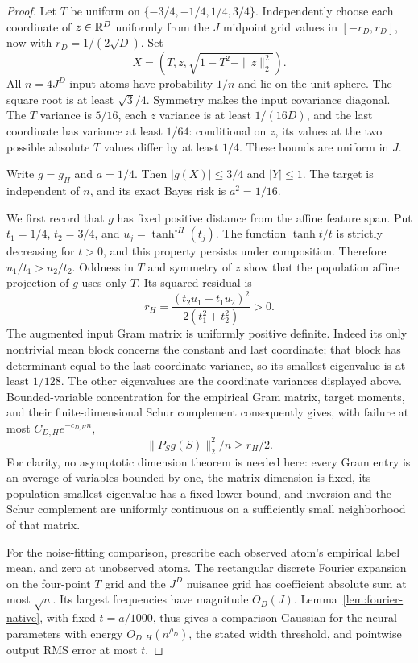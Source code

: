 \begin{proof}
Let $T$ be uniform on $\{-3/4,-1/4,1/4,3/4\}$. Independently choose each coordinate of $z\in\mathbb R^D$ uniformly from the $J$ midpoint grid values in $[-r_D,r_D]$, now with $r_D=1/(2\sqrt D)$. Set
\[
 X=(T,z,\sqrt{1-T^2-\|z\|_2^2}).
\]
All $n=4J^D$ input atoms have probability $1/n$ and lie on the unit sphere. The square root is at least $\sqrt3/4$. Symmetry makes the input covariance diagonal. The $T$ variance is $5/16$, each $z$ variance is at least $1/(16D)$, and the last coordinate has variance at least $1/64$: conditional on $z$, its values at the two possible absolute $T$ values differ by at least $1/4$. These bounds are uniform in $J$.

Write $g=g_H$ and $a=1/4$. Then $|g(X)|\le3/4$ and $|Y|\le1$. The target is independent of $n$, and its exact Bayes risk is $a^2=1/16$.

We first record that $g$ has fixed positive distance from the affine feature span. Put $t_1=1/4$, $t_2=3/4$, and $u_j=\tanh^{\circ H}(t_j)$. The function $\tanh t/t$ is strictly decreasing for $t>0$, and this property persists under composition. Therefore $u_1/t_1>u_2/t_2$. Oddness in $T$ and symmetry of $z$ show that the population affine projection of $g$ uses only $T$. Its squared residual is
\begin{equation}
 r_H=\frac{(t_2u_1-t_1u_2)^2}{2(t_1^2+t_2^2)}>0.
 \label{eq:fixed-affine-residual}
\end{equation}
The augmented input Gram matrix is uniformly positive definite. Indeed its only nontrivial mean block concerns the constant and last coordinate; that block has determinant equal to the last-coordinate variance, so its smallest eigenvalue is at least $1/128$. The other eigenvalues are the coordinate variances displayed above. Bounded-variable concentration for the empirical Gram matrix, target moments, and their finite-dimensional Schur complement consequently gives, with failure at most $C_{D,H}e^{-c_{D,H}n}$,
\begin{equation}
 \|P_S g(S)\|_2^2/n\ge r_H/2.
 \label{eq:empirical-affine-residual}
\end{equation}
For clarity, no asymptotic dimension theorem is needed here: every Gram entry is an average of variables bounded by one, the matrix dimension is fixed, its population smallest eigenvalue has a fixed lower bound, and inversion and the Schur complement are uniformly continuous on a sufficiently small neighborhood of that matrix.

For the noise-fitting comparison, prescribe each observed atom's empirical label mean, and zero at unobserved atoms. The rectangular discrete Fourier expansion on the four-point $T$ grid and the $J^D$ nuisance grid has coefficient absolute sum at most $\sqrt n$. Its largest frequencies have magnitude $O_D(J)$. Lemma~\ref{lem:fourier-native}, with fixed $t=a/1000$, thus gives a comparison Gaussian for the neural parameters with energy $O_{D,H}(n^{\rho_D})$, the stated width threshold, and pointwise output RMS error at most $t$.


\end{proof}
